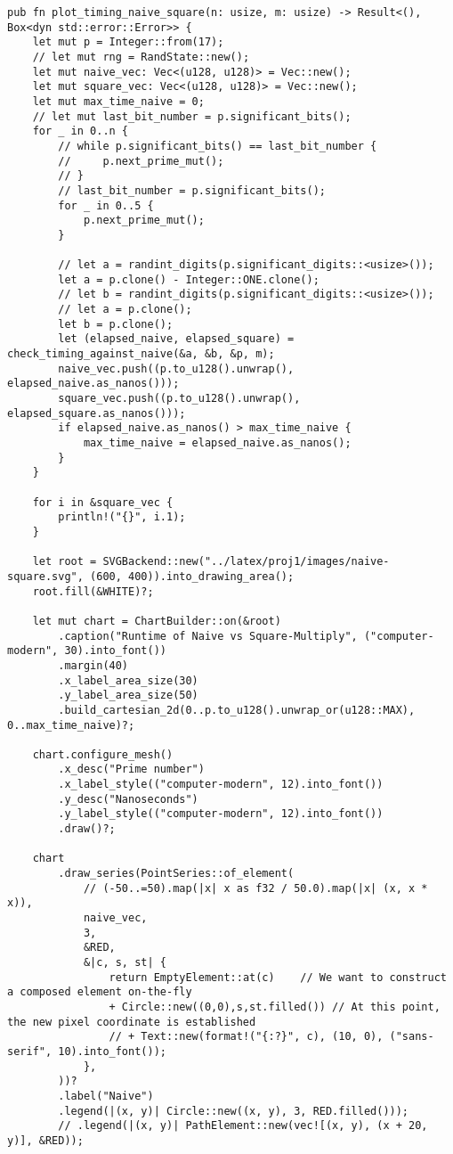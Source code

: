 \begin{verbatim}
pub fn plot_timing_naive_square(n: usize, m: usize) -> Result<(), Box<dyn std::error::Error>> {
    let mut p = Integer::from(17);
    // let mut rng = RandState::new();
    let mut naive_vec: Vec<(u128, u128)> = Vec::new();
    let mut square_vec: Vec<(u128, u128)> = Vec::new();
    let mut max_time_naive = 0;
    // let mut last_bit_number = p.significant_bits();
    for _ in 0..n {
        // while p.significant_bits() == last_bit_number {
        //     p.next_prime_mut();
        // }
        // last_bit_number = p.significant_bits();
        for _ in 0..5 {
            p.next_prime_mut();
        }

        // let a = randint_digits(p.significant_digits::<usize>());
        let a = p.clone() - Integer::ONE.clone();
        // let b = randint_digits(p.significant_digits::<usize>());
        // let a = p.clone();
        let b = p.clone();
        let (elapsed_naive, elapsed_square) = check_timing_against_naive(&a, &b, &p, m);
        naive_vec.push((p.to_u128().unwrap(), elapsed_naive.as_nanos()));
        square_vec.push((p.to_u128().unwrap(), elapsed_square.as_nanos()));
        if elapsed_naive.as_nanos() > max_time_naive {
            max_time_naive = elapsed_naive.as_nanos();
        }
    }

    for i in &square_vec {
        println!("{}", i.1);
    }

    let root = SVGBackend::new("../latex/proj1/images/naive-square.svg", (600, 400)).into_drawing_area();
    root.fill(&WHITE)?;

    let mut chart = ChartBuilder::on(&root)
        .caption("Runtime of Naive vs Square-Multiply", ("computer-modern", 30).into_font())
        .margin(40)
        .x_label_area_size(30)
        .y_label_area_size(50)
        .build_cartesian_2d(0..p.to_u128().unwrap_or(u128::MAX), 0..max_time_naive)?;

    chart.configure_mesh()
        .x_desc("Prime number")
        .x_label_style(("computer-modern", 12).into_font())
        .y_desc("Nanoseconds")
        .y_label_style(("computer-modern", 12).into_font())
        .draw()?;

    chart
        .draw_series(PointSeries::of_element(
            // (-50..=50).map(|x| x as f32 / 50.0).map(|x| (x, x * x)),
            naive_vec,
            3,
            &RED,
            &|c, s, st| {
                return EmptyElement::at(c)    // We want to construct a composed element on-the-fly
                + Circle::new((0,0),s,st.filled()) // At this point, the new pixel coordinate is established
                // + Text::new(format!("{:?}", c), (10, 0), ("sans-serif", 10).into_font());
            },
        ))?
        .label("Naive")
        .legend(|(x, y)| Circle::new((x, y), 3, RED.filled()));
        // .legend(|(x, y)| PathElement::new(vec![(x, y), (x + 20, y)], &RED));


\end{verbatim}
